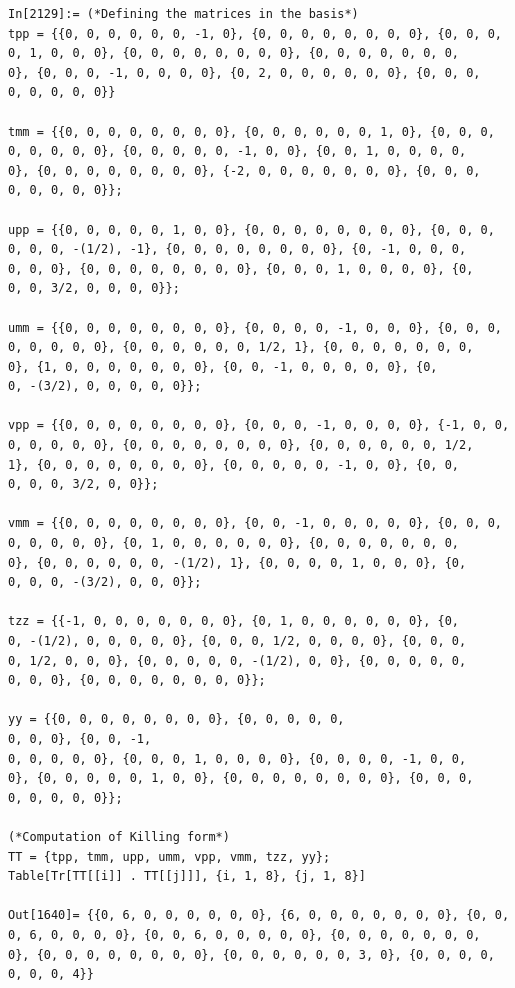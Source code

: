 \documentclass[a4paper,12pt]{article}
\begin{document}
\begin{lstlisting}
In[2129]:= (*Defining the matrices in the basis*)
tpp = {{0, 0, 0, 0, 0, 0, -1, 0}, {0, 0, 0, 0, 0, 0, 0, 0}, {0, 0, 0, 
0, 1, 0, 0, 0}, {0, 0, 0, 0, 0, 0, 0, 0}, {0, 0, 0, 0, 0, 0, 0, 
0}, {0, 0, 0, -1, 0, 0, 0, 0}, {0, 2, 0, 0, 0, 0, 0, 0}, {0, 0, 0, 
0, 0, 0, 0, 0}}

tmm = {{0, 0, 0, 0, 0, 0, 0, 0}, {0, 0, 0, 0, 0, 0, 1, 0}, {0, 0, 0, 
0, 0, 0, 0, 0}, {0, 0, 0, 0, 0, -1, 0, 0}, {0, 0, 1, 0, 0, 0, 0, 
0}, {0, 0, 0, 0, 0, 0, 0, 0}, {-2, 0, 0, 0, 0, 0, 0, 0}, {0, 0, 0,
0, 0, 0, 0, 0}};

upp = {{0, 0, 0, 0, 0, 1, 0, 0}, {0, 0, 0, 0, 0, 0, 0, 0}, {0, 0, 0, 
0, 0, 0, -(1/2), -1}, {0, 0, 0, 0, 0, 0, 0, 0}, {0, -1, 0, 0, 0, 
0, 0, 0}, {0, 0, 0, 0, 0, 0, 0, 0}, {0, 0, 0, 1, 0, 0, 0, 0}, {0, 
0, 0, 3/2, 0, 0, 0, 0}};

umm = {{0, 0, 0, 0, 0, 0, 0, 0}, {0, 0, 0, 0, -1, 0, 0, 0}, {0, 0, 0, 
0, 0, 0, 0, 0}, {0, 0, 0, 0, 0, 0, 1/2, 1}, {0, 0, 0, 0, 0, 0, 0, 
0}, {1, 0, 0, 0, 0, 0, 0, 0}, {0, 0, -1, 0, 0, 0, 0, 0}, {0, 
0, -(3/2), 0, 0, 0, 0, 0}};

vpp = {{0, 0, 0, 0, 0, 0, 0, 0}, {0, 0, 0, -1, 0, 0, 0, 0}, {-1, 0, 0,
0, 0, 0, 0, 0}, {0, 0, 0, 0, 0, 0, 0, 0}, {0, 0, 0, 0, 0, 0, 1/2,
1}, {0, 0, 0, 0, 0, 0, 0, 0}, {0, 0, 0, 0, 0, -1, 0, 0}, {0, 0, 
0, 0, 0, 3/2, 0, 0}};

vmm = {{0, 0, 0, 0, 0, 0, 0, 0}, {0, 0, -1, 0, 0, 0, 0, 0}, {0, 0, 0, 
0, 0, 0, 0, 0}, {0, 1, 0, 0, 0, 0, 0, 0}, {0, 0, 0, 0, 0, 0, 0, 
0}, {0, 0, 0, 0, 0, 0, -(1/2), 1}, {0, 0, 0, 0, 1, 0, 0, 0}, {0, 
0, 0, 0, -(3/2), 0, 0, 0}};

tzz = {{-1, 0, 0, 0, 0, 0, 0, 0}, {0, 1, 0, 0, 0, 0, 0, 0}, {0, 
0, -(1/2), 0, 0, 0, 0, 0}, {0, 0, 0, 1/2, 0, 0, 0, 0}, {0, 0, 0, 
0, 1/2, 0, 0, 0}, {0, 0, 0, 0, 0, -(1/2), 0, 0}, {0, 0, 0, 0, 0, 
0, 0, 0}, {0, 0, 0, 0, 0, 0, 0, 0}};

yy = {{0, 0, 0, 0, 0, 0, 0, 0}, {0, 0, 0, 0, 0,
0, 0, 0}, {0, 0, -1, 
0, 0, 0, 0, 0}, {0, 0, 0, 1, 0, 0, 0, 0}, {0, 0, 0, 0, -1, 0, 0, 
0}, {0, 0, 0, 0, 0, 1, 0, 0}, {0, 0, 0, 0, 0, 0, 0, 0}, {0, 0, 0, 
0, 0, 0, 0, 0}};

(*Computation of Killing form*)
TT = {tpp, tmm, upp, umm, vpp, vmm, tzz, yy};
Table[Tr[TT[[i]] . TT[[j]]], {i, 1, 8}, {j, 1, 8}]

Out[1640]= {{0, 6, 0, 0, 0, 0, 0, 0}, {6, 0, 0, 0, 0, 0, 0, 0}, {0, 0,
0, 6, 0, 0, 0, 0}, {0, 0, 6, 0, 0, 0, 0, 0}, {0, 0, 0, 0, 0, 0, 0, 
0}, {0, 0, 0, 0, 0, 0, 0, 0}, {0, 0, 0, 0, 0, 0, 3, 0}, {0, 0, 0, 0,
0, 0, 0, 4}}
\end{lstlisting}
\end{document}
